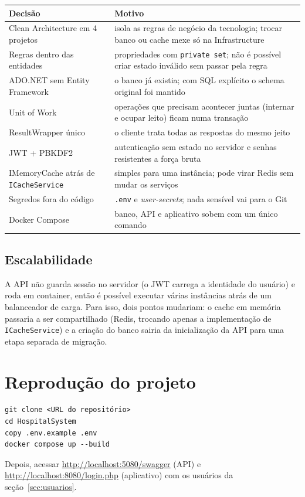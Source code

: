 \documentclass[12pt,a4paper]{article}
\newcommand{\cod}[1]{\texttt{#1}}
\begin{document}
\begin{tabularx}{\textwidth}{@{}lL@{}}
\toprule
\textbf{Decisão} & \textbf{Motivo} \\
\midrule
Clean Architecture em 4 projetos & isola as regras de negócio da tecnologia; trocar banco ou cache mexe só na Infrastructure \\
Regras dentro das entidades & propriedades com \cod{private set}; não é possível criar estado inválido sem passar pela regra \\
ADO.NET sem Entity Framework & o banco já existia; com SQL explícito o schema original foi mantido \\
Unit of Work & operações que precisam acontecer juntas (internar e ocupar leito) ficam numa transação \\
ResultWrapper único & o cliente trata todas as respostas do mesmo jeito \\
JWT + PBKDF2 & autenticação sem estado no servidor e senhas resistentes a força bruta \\
IMemoryCache atrás de \cod{ICacheService} & simples para uma instância; pode virar Redis sem mudar os serviços \\
Segredos fora do código & \cod{.env} e \textit{user-secrets}; nada sensível vai para o Git \\
Docker Compose & banco, API e aplicativo sobem com um único comando \\
\bottomrule
\end{tabularx}

\subsection{Escalabilidade}

A API não guarda sessão no servidor (o JWT carrega a identidade do usuário) e roda em
container, então é possível executar várias instâncias atrás de um balanceador de carga. Para
isso, dois pontos mudariam: o cache em memória passaria a ser compartilhado (Redis, trocando
apenas a implementação de \cod{ICacheService}) e a criação do banco sairia da inicialização da
API para uma etapa separada de migração.

\section{Reprodução do projeto}

\begin{lstlisting}
git clone <URL do repositório>
cd HospitalSystem
copy .env.example .env
docker compose up --build
\end{lstlisting}

Depois, acessar \url{http://localhost:5080/swagger} (API) e
\url{http://localhost:8080/login.php} (aplicativo) com os usuários da seção~\ref{sec:usuarios}.
\end{document}
